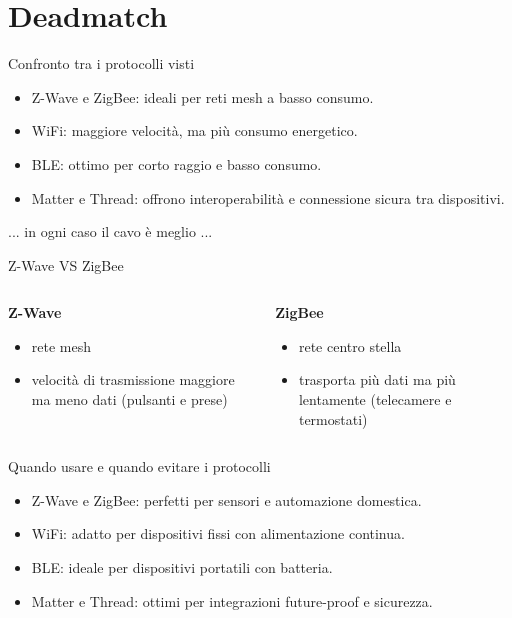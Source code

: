 \documentclass{beamer}
\begin{document}
	\section{Deadmatch}
	
	\begin{frame}{Confronto tra i protocolli visti}
		\begin{itemize}
			\item Z-Wave e ZigBee: ideali per reti mesh a basso consumo.
			\item WiFi: maggiore velocità, ma più consumo energetico.
			\item BLE: ottimo per corto raggio e basso consumo.
			\item Matter e Thread: offrono interoperabilità e connessione sicura tra dispositivi.
		\end{itemize}
		\begin{center}
			... in ogni caso il cavo è meglio ...
		\end{center}
	
	\end{frame}
	
	\begin{frame}{Z-Wave VS ZigBee}
		\begin{columns}
			\begin{column}{0.5\textwidth}
				\textbf{Z-Wave}
				\begin{itemize}
					\item rete mesh
					\item velocità di trasmissione maggiore ma meno dati (pulsanti e prese)
				\end{itemize}
			\end{column}
			\begin{column}{0.5\textwidth}
				\textbf{ZigBee}
				\begin{itemize}
					\item rete centro stella
					\item trasporta più dati ma più lentamente (telecamere e termostati)
				\end{itemize}
			\end{column}
		\end{columns}
	\end{frame}
	\begin{frame}{Quando usare e quando evitare i protocolli}
		\begin{itemize}
			\item Z-Wave e ZigBee: perfetti per sensori e automazione domestica.
			\item WiFi: adatto per dispositivi fissi con alimentazione continua.
			\item BLE: ideale per dispositivi portatili con batteria.
			\item Matter e Thread: ottimi per integrazioni future-proof e sicurezza.
		\end{itemize}
	\end{frame}
\end{document}
